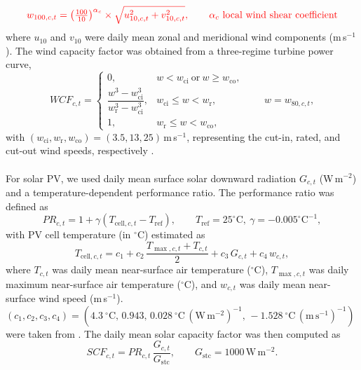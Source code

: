 \documentclass[pdflatex,sn-mathphys-num]{sn-jnl}%
\begin{document}
\begin{equation}
    {\color{red}w_{100,c,t}=\left(\tfrac{100}{10}\right)^{\alpha_{c}} \times \sqrt{u_{10,c,t}^2+v_{10,c,t}^2}, \qquad \alpha_{c}\ \text{local wind shear coefficient}}
\end{equation}
where $u_{10}$ and $v_{10}$ were daily mean zonal and meridional wind components (m\,s$^{-1}$). The wind capacity factor was obtained from a three-regime turbine power curve,
\begin{equation}
    WCF_{c,t}=
\begin{cases}
0, & w<w_{\mathrm{ci}} \ \text{or}\ w\ge w_{\mathrm{co}},\\[3pt]
\dfrac{w^{3}-w_{\mathrm{ci}}^{3}}{w_{\mathrm{r}}^{3}-w_{\mathrm{ci}}^{3}}, & w_{\mathrm{ci}}\le w< w_{\mathrm{r}},\\[8pt]
1, & w_{\mathrm{r}}\le w< w_{\mathrm{co}},
\end{cases}
\qquad w=w_{80,c,t},
\end{equation}
with $(w_{\mathrm{ci}}, w_{\mathrm{r}}, w_{\mathrm{co}})=(3.5,13,25)$\,m\,s$^{-1}$, representing the cut-in, rated, and cut-out wind speeds, respectively \cite{vanderwielMeteorologicalConditionsLeading2019}.\\
\\
For solar PV, we used daily mean surface solar downward radiation $G_{c,t}$ (W\,m$^{-2}$) and a temperature-dependent performance ratio. The performance ratio was defined as
\begin{equation}
    PR_{c,t}=1+\gamma\left(T_{\mathrm{cell},c,t}-T_{\mathrm{ref}}\right),
    \qquad T_{\mathrm{ref}}=25^{\circ}\mathrm{C},\ \gamma=-0.005^\circ\mathrm{C}^{-1}, 
\end{equation}
with PV cell temperature (in $^{\circ}$C) estimated as
\begin{equation}
T_{\mathrm{cell},c,t}
= c_1+c_2\,\frac{T_{\max,c,t}+T_{c,t}}{2}+c_3\,G_{c,t}+c_4\,w_{c,t},
\end{equation}
where $T_{c,t}$ was daily mean near-surface air temperature ($^{\circ}$C), $T_{\max,c,t}$ was daily maximum near-surface air temperature ($^{\circ}$C), and $w_{c,t}$ was daily mean near-surface wind speed (m\,s$^{-1}$). $(c_1,c_2,c_3,c_4)=\left(
4.3~^{\circ}\mathrm{C},\,
0.943,\,
0.028~^{\circ}\mathrm{C}\,(\mathrm{W\,m^{-2}})^{-1},\,
-1.528~^{\circ}\mathrm{C}\,(\mathrm{m\,s^{-1}})^{-1}
\right)$ were taken from \cite{PhotovoltaicModuleThermal}. The daily mean solar capacity factor was then computed as
\begin{equation}
    SCF_{c,t}=PR_{c,t}\,\frac{G_{c,t}}{G_{\mathrm{stc}}},\qquad G_{\mathrm{stc}}=1000\,\mathrm{W\,m^{-2}}.
\end{equation}
\end{document}
